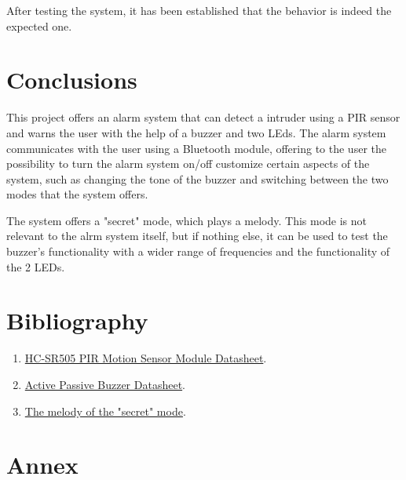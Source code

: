 \documentclass[a4paper,12pt]{report}
\begin{document}
\vspace{5mm}

After testing the system, it has been established that the behavior is indeed the expected one.

\chapter{Conclusions}

This project offers an alarm system that can detect a intruder using a PIR sensor and warns the user with the help of a buzzer and two LEds.  The alarm system communicates with the user using a Bluetooth module, offering to the user the possibility to turn the alarm system on/off customize certain aspects of the system, such as changing the tone of the buzzer and switching between the two modes that the system offers.

\vspace{5mm}

The system offers a "secret" mode, which plays a melody. This mode is not relevant to the alrm system itself, but if nothing else, it can be used to test the buzzer's functionality with a wider range of frequencies and the functionality of the 2 LEDs.

\chapter{Bibliography}

\begin{enumerate}

\item \href{https://components101.com/sensors/hc-sr505-pir-sensor-pinout-datasheet}{HC-SR505 PIR Motion Sensor Module Datasheet}.
\item \href{https://components101.com/buzzer-pinout-working-datasheett}{Active Passive Buzzer Datasheet}.
\item \href{https://github.com/robsoncouto/arduino-songs/blob/master/nevergonnagiveyouup/nevergonnagiveyouup.ino}{The melody of the "secret" mode}.

\end{enumerate}


\chapter{Annex}
\end{document}
